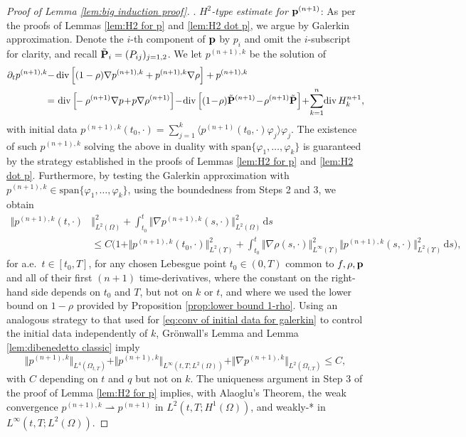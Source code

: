 \documentclass[11pt,a4paper,reqno]{amsart}
\theoremstyle{remark}
\theoremstyle{definition}
\numberwithin{equation}{section}
\DeclareMathOperator{\dv}{div}
\renewcommand{\span}{\mathrm{span}}
\renewcommand{\P}{{\bf P}}
\newcommand{\p}{{\bf p}}
\renewcommand{\d}{\, \mathrm{d} }
\newcommand{\rr}[1]{\rho^{(#1)}}
\def\de{\partial}
\begin{document}
\begin{proof}[Proof of Lemma \ref{lem:big induction proof}]
. \textit{$H^2$-type estimate for $\p^{(n+1)}$}:   As per the proofs of Lemmas \ref{lem:H2 for p} and \ref{lem:H2 dot p}, we argue by Galerkin approximation. Denote the $i$-th component of $\p$ by $p_i$ and omit the $i$-subscript for clarity, and recall $\tilde{\P}_i = (P_{ij})_{j=1,2}$. We let $p^{(n+1),k}$ be the solution of 
\begin{equation*}
   \begin{aligned}
    \de_t p^{(n+1),k} - &\dv\Big[  (1-\rho)\nabla p^{(n+1),k}  + p^{(n+1),k} \nabla \rho  \Big]  + p^{(n+1),k}
\\ 
=& \, \dv\Big[ \!\! -\rr{n+1}\nabla p  \!+\! p \nabla \rr{n+1}  \Big] \!-\! \dv\Big[
 (1\!-\! \rho) \tilde{\P}^{(n+1)} \!-\! \rr{n+1} \tilde{\P}
    \Big] \!+\! \sum_{k=1}^{n}\! \dv H^{n+1}_k,  
\end{aligned}
\end{equation*}
with initial data $p^{(n+1),k}(t_0,\cdot) = \sum_{j=1}^k \langle p^{(n+1)}(t_0,\cdot) \varphi_j \rangle \varphi_j$. The existence of such $p^{(n+1),k}$ solving the above in duality with $\span\{\varphi_1,\dots,\varphi_k\}$ is guaranteed by the strategy established in the proofs of Lemmas \ref{lem:H2 for p} and \ref{lem:H2 dot p}. Furthermore, by testing the Galerkin approximation with $p^{(n+1),k} \in \span\{\varphi_1,\dots,\varphi_k\}$, using the boundedness from Steps 2 and 3, we obtain 
\begin{equation*}
   \begin{aligned}
       \Vert p^{(n+1),k}(t,\cdot) & \Vert^2_{L^2(\Omega)} + \int_{t_0}^t \Vert \nabla p^{(n+1),k}(s,\cdot) \Vert^2_{L^2(\Omega)} \d s \\ 
       &\leq C\Big( 1 + \Vert p^{(n+1),k}(t_0,\cdot)\Vert^2_{L^2(\Upsilon)} + \int_{t_0}^t \Vert \nabla \rho (s,\cdot) \Vert^2_{L^\infty(\Upsilon)} \Vert p^{(n+1),k} (s,\cdot) \Vert^2_{L^2(\Upsilon)} \d s \Big), 
   \end{aligned}
\end{equation*}
for a.e.~$t \in [t_0,T]$, for any chosen Lebesgue point $t_0 \in (0,T)$ common to $f,\rho,\p$ and all of their first $(n+1)$ time-derivatives, where the constant on the right-hand side depends on $t_0$ and $T$, but not on $k$ or $t$, and where we used the lower bound on $1-\rho$ provided by Proposition \ref{prop:lower bound 1-rho}. Using an analogous strategy to that used for \eqref{eq:conv of initial data for galerkin} to control the initial data independently of $k$, Gr\"onwall's Lemma and Lemma \ref{lem:dibenedetto classic} imply 
\begin{equation*}
  \Vert p^{(n+1),k} \Vert_{L^4(\Omega_{t,T})}  +  \Vert p^{(n+1),k} \Vert_{L^\infty(t,T;L^2(\Omega))} + \Vert \nabla p^{(n+1),k} \Vert_{L^2(\Omega_{t,T})} \leq C, 
\end{equation*}
with $C$ depending on $t$ and $q$ but not on $k$. The uniqueness argument in Step 3 of the proof of Lemma \ref{lem:H2 for p} implies, with Alaoglu's Theorem, the weak convergence $p^{(n+1),k} \rightharpoonup p^{(n+1)}$ in $L^2(t,T;H^1(\Omega))$, and weakly-* in $L^\infty(t,T;L^2(\Omega))$. 



\end{proof}
\end{document}
